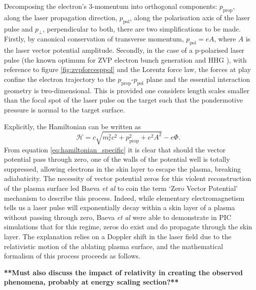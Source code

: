 Decomposing the electron's 3-momentum into orthogonal components: $p_\mathrm{prop}$, along the laser propagation direction, $p_\mathrm{pol}$, along the polarisation axis of the laser pulse and $p_\perp$, perpendicular to both, there are two simplifications to be made. Firstly, by canonical conservation of transverse momentum, $p_\mathrm{pol} = eA$, where $A$ is the laser vector potential amplitude. Secondly, in the case of a p-polarised laser pulse (the known optimum for ZVP electron bunch generation \cite{savinAttosecondscaleAbsorptionExtreme2017} and \ac{HHG} \cite{baevaTheoryHighorderHarmonic2006}), with reference to figure \ref{fig:zvpforcesppol} and the Lorentz force law, the forces at play confine the electron trajectory to the  $p_\mathrm{prop}$-$p_\mathrm{pol}$ plane and the essential interaction geometry is two-dimensional. This is provided one considers length scales smaller than the focal spot of the laser pulse on the target such that the pondermotive pressure is normal to the target surface.

Explicitly, the Hamiltonian can be written as
\begin{equation}\label{eq:hamiltonian_specific}
	\mathcal{H} = c\sqrt{m^2_ec^2 + p^2_\mathrm{prop} + e^2A^2} - e\Phi.
\end{equation}
From equation \ref{eq:hamiltonian_specific} it is clear that should the vector potential pass through zero, one of the walls of the potential well is totally suppressed, allowing electrons in the skin layer to escape the plasma, breaking adiabaticity. The necessity of vector potential zeros for this violent reconstruction of the plasma surface led Baeva \textit{et al} \cite{baevaZeroVectorPotential2011} to coin the term `Zero Vector Potential' mechanism to describe this process. Indeed, while elementary electromagnetism tells us a laser pulse will exponentially decay within a skin layer of a plasma without passing through zero, Baeva \textit{et al} \cite{baevaZeroVectorPotential2011} were able to demonstrate in \ac{PIC} simulations that for this regime, zeros do exist and do propagate through the skin layer. The explanation relies on a Doppler shift in the laser field due to the relativistic motion of the ablating plasma surface, and the mathematical formalism of this process proceeds as follows.

\textbf{**Must also discuss the impact of relativity in creating the observed phenomena, probably at energy scaling section?**}

